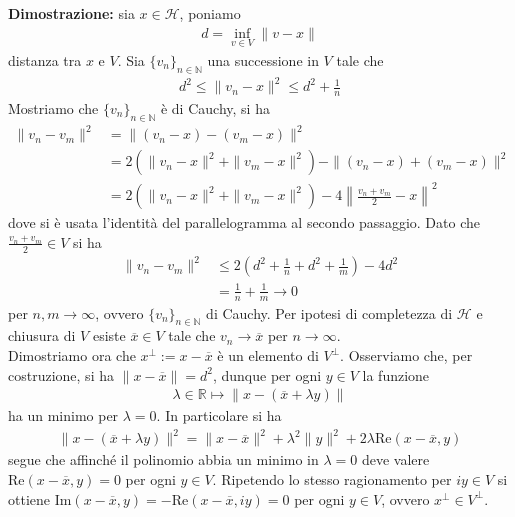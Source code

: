 \documentclass{article}
\numberwithin{equation}{subsection}
\begin{document}
\textbf{Dimostrazione:} sia $x \in \mathcal{H}$, poniamo 
\begin{align*}
    d = \inf_{v \in V}\|v - x\| 
\end{align*}
distanza tra $x$ e $V$. Sia $\{v_n\}_{n \in \mathbb{N}}$ una successione in $V$ tale che 
\begin{align*}
    d^2 \leq \|v_n - x\|^2 \leq d^2 + \frac{1}{n} 
\end{align*}
Mostriamo che $\{v_n\}_{n \in \mathbb{N}}$ è di Cauchy, si ha 
\begin{align*}
    \|v_n - v_m\|^2 &= \|(v_n - x) - (v_m - x)\|^2  \\
    &= 2(\|v_n - x\|^2 + \|v_m - x\|^2) - \|(v_n - x) + (v_m - x)\|^2  \\
    &= 2(\|v_n - x\|^2 + \|v_m - x\|^2) - 4\left\|\frac{v_n + v_m}{2} - x\right\|^2 
\end{align*}
dove si è usata l'identità del parallelogramma al secondo passaggio. Dato che $\frac{v_n + v_m}{2} \in V$ si ha 
\begin{align*}
    \|v_n - v_m\|^2 &\leq 2\left(d^2 + \frac{1}{n} + d^2 + \frac{1}{m}\right) - 4d^2  \\
    &= \frac{1}{n} + \frac{1}{m} \rightarrow 0 
\end{align*}
per $n, m \rightarrow \infty$, ovvero $\{v_n\}_{n \in \mathbb{N}}$ di Cauchy. Per ipotesi di completezza di $\mathcal{H}$ e chiusura di $V$ esiste $\overline{x} \in V$ tale che $v_n \rightarrow \overline{x}$ per $n \rightarrow \infty$. \\
Dimostriamo ora che $x^\perp := x - \overline{x}$ è un elemento di $V^\perp$. Osserviamo che, per costruzione, si ha $\|x - \overline{x}\| = d^2$, dunque per ogni $y \in V$ la funzione 
\begin{align*}
    \lambda \in \mathbb{R} \mapsto \|x - (\overline{x} + \lambda y)\| 
\end{align*}
ha un minimo per $\lambda = 0$. In particolare si ha 
\begin{align*}
    \|x - (\overline{x} + \lambda y)\|^2 = \|x - \overline{x}\|^2 + \lambda^2\|y\|^2 + 2\lambda\mathrm{Re}(x - \overline{x}, y) 
\end{align*}
segue che affinché il polinomio abbia un minimo in $\lambda = 0$ deve valere $\mathrm{Re}(x - \overline{x}, y) = 0$ per ogni $y \in V$. Ripetendo lo stesso ragionamento per $iy \in V$ si ottiene $\mathrm{Im}(x - \overline{x}, y) = -\mathrm{Re}(x - \overline{x}, iy) = 0$ per ogni $y \in V$, ovvero $x^\perp \in V^\perp$. \\ \\
\end{document}

